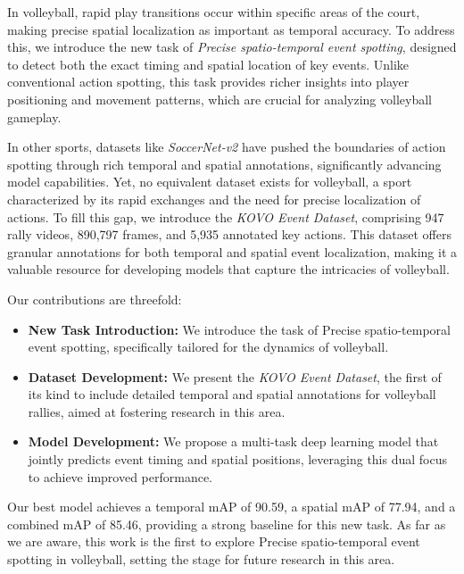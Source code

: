 \documentclass[conference]{IEEEtran}
\begin{document}
In volleyball, rapid play transitions occur within specific areas of the court, making precise spatial localization as important as temporal accuracy. To address this, we introduce the new task of \textit{Precise spatio-temporal event spotting}, designed to detect both the exact timing and spatial location of key events. Unlike conventional action spotting, this task provides richer insights into player positioning and movement patterns, which are crucial for analyzing volleyball gameplay.

In other sports, datasets like \textit{SoccerNet-v2} \cite{soccernetv2} have pushed the boundaries of action spotting through rich temporal and spatial annotations, significantly advancing model capabilities. Yet, no equivalent dataset exists for volleyball, a sport characterized by its rapid exchanges and the need for precise localization of actions. To fill this gap, we introduce the \textit{KOVO Event Dataset}, comprising 947 rally videos, 890,797 frames, and 5,935 annotated key actions. This dataset offers granular annotations for both temporal and spatial event localization, making it a valuable resource for developing models that capture the intricacies of volleyball.

Our contributions are threefold:
\begin{itemize}
    \item \textbf{New Task Introduction:} We introduce the task of Precise spatio-temporal event spotting, specifically tailored for the dynamics of volleyball.
    \item \textbf{Dataset Development:} We present the \textit{KOVO Event Dataset}, the first of its kind to include detailed temporal and spatial annotations for volleyball rallies, aimed at fostering research in this area.
    \item \textbf{Model Development:} We propose a multi-task deep learning model that jointly predicts event timing and spatial positions, leveraging this dual focus to achieve improved performance. 
\end{itemize}

Our best model achieves a temporal mAP of 90.59, a spatial mAP of 77.94, and a combined mAP of 85.46, providing a strong baseline for this new task. As far as we are aware, this work is the first to explore Precise spatio-temporal event spotting in volleyball, setting the stage for future research in this area.
\end{document}
